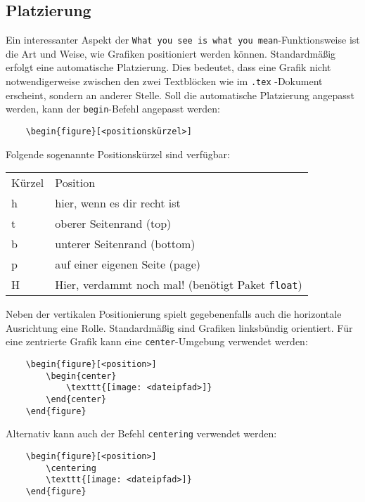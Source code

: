 \subsection{Platzierung} %
\label{sub:platzierung}
Ein interessanter Aspekt der \texttt{What you see is what you mean}-Funktionsweise ist die Art und Weise, wie Grafiken positioniert werden können. Standardmäßig erfolgt eine automatische Platzierung. Dies bedeutet, dass eine Grafik nicht notwendigerweise zwischen den zwei Textblöcken wie im \texttt{.tex} -Dokument erscheint, sondern an anderer Stelle. Soll die automatische Platzierung angepasst werden, kann der \texttt{begin}-Befehl angepasst werden:
\begin{verbatim}
	\begin{figure}[<positionskürzel>]
\end{verbatim}
Folgende sogenannte Positionskürzel sind verfügbar:
\begin{table}[h!]
\begin{tabular}{ll}
Kürzel & Position                                        \\
h      & hier, wenn es dir recht ist                     \\
t      & oberer Seitenrand (top)                         \\
b      & unterer Seitenrand (bottom)                     \\
p      & auf einer eigenen Seite (page)                  \\
H      & Hier, verdammt noch mal! (benötigt Paket \texttt{float})
\end{tabular}
\end{table}
Neben der vertikalen Positionierung spielt gegebenenfalls auch die horizontale Ausrichtung eine Rolle. Standardmäßig sind Grafiken linksbündig orientiert. Für eine zentrierte Grafik kann eine \texttt{center}-Umgebung verwendet werden:
\begin{verbatim}
	\begin{figure}[<position>]
    	\begin{center}
        	\texttt{[image: <dateipfad>]}
    	\end{center}
	\end{figure}
\end{verbatim}
Alternativ kann auch der Befehl \texttt{centering} verwendet werden:
\begin{verbatim}
	\begin{figure}[<position>]
    	\centering
    	\texttt{[image: <dateipfad>]}
	\end{figure}
\end{verbatim}

